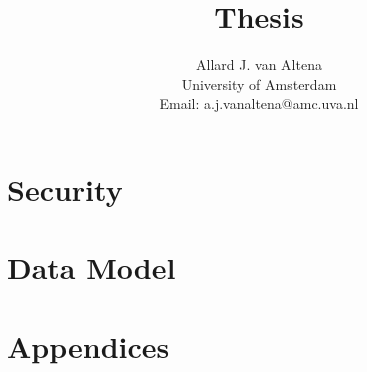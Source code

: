 \documentclass[a4paper]{article}
\title{Thesis}
\author{
	Allard J. van Altena\\
	University of Amsterdam\\
	Email: a.j.vanaltena@amc.uva.nl
}
\begin{document}
	
	
	\section{Security}
	\label{security}
	
	
	
	
	\section{Data Model}
	
	
	\clearpage
	
	\printbibliography
	
	\clearpage
	
	\section{Appendices}
	
\end{document}
